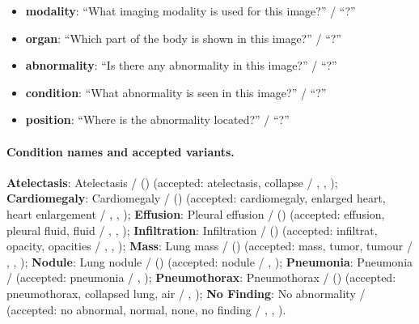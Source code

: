 \begin{itemize}[leftmargin=*,itemsep=1pt]\item \textbf{modality}: ``What imaging modality is used for this image?'' / ``?''\item \textbf{organ}: ``Which part of the body is shown in this image?'' / ``?''\item \textbf{abnormality}: ``Is there any abnormality in this image?'' / ``?''\item \textbf{condition}: ``What abnormality is seen in this image?'' / ``?''\item \textbf{position}: ``Where is the abnormality located?'' / ``?''\end{itemize}

\paragraph{Condition names and accepted variants.} \textbf{Atelectasis}: Atelectasis /  () (accepted: atelectasis, collapse / , , ); \textbf{Cardiomegaly}: Cardiomegaly /  () (accepted: cardiomegaly, enlarged heart, heart enlargement / , , ); \textbf{Effusion}: Pleural effusion /  () (accepted: effusion, pleural fluid, fluid / , , ); \textbf{Infiltration}: Infiltration /  () (accepted: infiltrat, opacity, opacities / , , ); \textbf{Mass}: Lung mass /  () (accepted: mass, tumor, tumour / , , ); \textbf{Nodule}: Lung nodule /  () (accepted: nodule / , ); \textbf{Pneumonia}: Pneumonia /  (accepted: pneumonia / , ); \textbf{Pneumothorax}: Pneumothorax /  () (accepted: pneumothorax, collapsed lung, air / , ); \textbf{No Finding}: No abnormality /  (accepted: no abnormal, normal, none, no finding / , , ).

